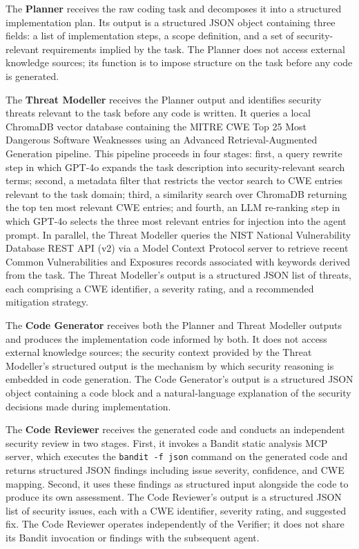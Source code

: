 The \textbf{Planner} receives the raw coding task and decomposes it into a structured implementation plan. Its output is a structured JSON object containing three fields: a list of implementation steps, a scope definition, and a set of security-relevant requirements implied by the task. The Planner does not access external knowledge sources; its function is to impose structure on the task before any code is generated.

The \textbf{Threat Modeller} receives the Planner output and identifies security threats relevant to the task before any code is written. It queries a local ChromaDB vector database containing the MITRE CWE Top 25 Most Dangerous Software Weaknesses \citep{mitre2024} using an Advanced Retrieval-Augmented Generation pipeline. This pipeline proceeds in four stages: first, a query rewrite step in which GPT-4o expands the task description into security-relevant search terms; second, a metadata filter that restricts the vector search to CWE entries relevant to the task domain; third, a similarity search over ChromaDB returning the top ten most relevant CWE entries; and fourth, an LLM re-ranking step in which GPT-4o selects the three most relevant entries for injection into the agent prompt. In parallel, the Threat Modeller queries the NIST National Vulnerability Database REST API (v2) via a Model Context Protocol server to retrieve recent Common Vulnerabilities and Exposures records associated with keywords derived from the task. The Threat Modeller's output is a structured JSON list of threats, each comprising a CWE identifier, a severity rating, and a recommended mitigation strategy.

The \textbf{Code Generator} receives both the Planner and Threat Modeller outputs and produces the implementation code informed by both. It does not access external knowledge sources; the security context provided by the Threat Modeller's structured output is the mechanism by which security reasoning is embedded in code generation. The Code Generator's output is a structured JSON object containing a code block and a natural-language explanation of the security decisions made during implementation.

The \textbf{Code Reviewer} receives the generated code and conducts an independent security review in two stages. First, it invokes a Bandit static analysis MCP server, which executes the \texttt{bandit -f json} command on the generated code and returns structured JSON findings including issue severity, confidence, and CWE mapping. Second, it uses these findings as structured input alongside the code to produce its own assessment. The Code Reviewer's output is a structured JSON list of security issues, each with a CWE identifier, severity rating, and suggested fix. The Code Reviewer operates independently of the Verifier; it does not share its Bandit invocation or findings with the subsequent agent.

